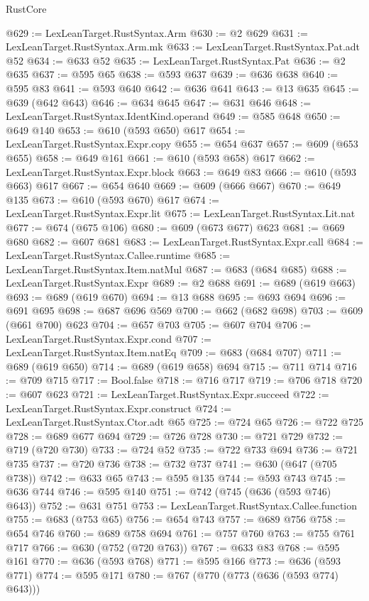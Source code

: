\begin{lexlean}{RustCore}
\begin{coremodule}
@629 := LexLeanTarget.RustSyntax.Arm
@630 := @2 @629
@631 := LexLeanTarget.RustSyntax.Arm.mk
@633 := LexLeanTarget.RustSyntax.Pat.adt @52
@634 := @633 @52
@635 := LexLeanTarget.RustSyntax.Pat
@636 := @2 @635
@637 := @595 @65
@638 := @593 @637
@639 := @636 @638
@640 := @595 @83
@641 := @593 @640
@642 := @636 @641
@643 := @13 @635
@645 := @639 (@642 @643)
@646 := @634 @645
@647 := @631 @646
@648 := LexLeanTarget.RustSyntax.IdentKind.operand
@649 := @585 @648
@650 := @649 @140
@653 := @610 (@593 @650) @617
@654 := LexLeanTarget.RustSyntax.Expr.copy
@655 := @654 @637
@657 := @609 (@653 @655)
@658 := @649 @161
@661 := @610 (@593 @658) @617
@662 := LexLeanTarget.RustSyntax.Expr.block
@663 := @649 @83
@666 := @610 (@593 @663) @617
@667 := @654 @640
@669 := @609 (@666 @667)
@670 := @649 @135
@673 := @610 (@593 @670) @617
@674 := LexLeanTarget.RustSyntax.Expr.lit
@675 := LexLeanTarget.RustSyntax.Lit.nat
@677 := @674 (@675 @106)
@680 := @609 (@673 @677) @623
@681 := @669 @680
@682 := @607 @681
@683 := LexLeanTarget.RustSyntax.Expr.call
@684 := LexLeanTarget.RustSyntax.Callee.runtime
@685 := LexLeanTarget.RustSyntax.Item.natMul
@687 := @683 (@684 @685)
@688 := LexLeanTarget.RustSyntax.Expr
@689 := @2 @688
@691 := @689 (@619 @663)
@693 := @689 (@619 @670)
@694 := @13 @688
@695 := @693 @694
@696 := @691 @695
@698 := @687 @696 @569
@700 := @662 (@682 @698)
@703 := @609 (@661 @700) @623
@704 := @657 @703
@705 := @607 @704
@706 := LexLeanTarget.RustSyntax.Expr.cond
@707 := LexLeanTarget.RustSyntax.Item.natEq
@709 := @683 (@684 @707)
@711 := @689 (@619 @650)
@714 := @689 (@619 @658) @694
@715 := @711 @714
@716 := @709 @715
@717 := Bool.false
@718 := @716 @717
@719 := @706 @718
@720 := @607 @623
@721 := LexLeanTarget.RustSyntax.Expr.succeed
@722 := LexLeanTarget.RustSyntax.Expr.construct
@724 := LexLeanTarget.RustSyntax.Ctor.adt @65
@725 := @724 @65
@726 := @722 @725
@728 := @689 @677 @694
@729 := @726 @728
@730 := @721 @729
@732 := @719 (@720 @730)
@733 := @724 @52
@735 := @722 @733 @694
@736 := @721 @735
@737 := @720 @736
@738 := @732 @737
@741 := @630 (@647 (@705 @738))
@742 := @633 @65
@743 := @595 @135
@744 := @593 @743
@745 := @636 @744
@746 := @595 @140
@751 := @742 (@745 (@636 (@593 @746) @643))
@752 := @631 @751
@753 := LexLeanTarget.RustSyntax.Callee.function
@755 := @683 (@753 @65)
@756 := @654 @743
@757 := @689 @756
@758 := @654 @746
@760 := @689 @758 @694
@761 := @757 @760
@763 := @755 @761 @717
@766 := @630 (@752 (@720 @763))
@767 := @633 @83
@768 := @595 @161
@770 := @636 (@593 @768)
@771 := @595 @166
@773 := @636 (@593 @771)
@774 := @595 @171
@780 := @767 (@770 (@773 (@636 (@593 @774) @643)))

\end{coremodule}
\end{lexlean}
